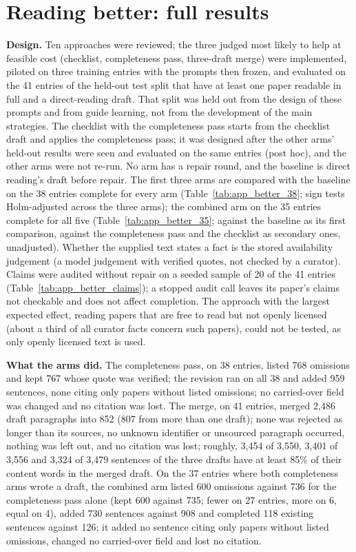 \documentclass{article} %
\begin{document}
\section{Reading better: full results}
\label{app:better}
\textbf{Design.} Ten approaches were reviewed; the three judged most likely to help at feasible cost (checklist, completeness pass, three-draft merge) were implemented, piloted on three training entries with the prompts then frozen, and evaluated on the 41 entries of the held-out test split that have at least one paper readable in full and a direct-reading draft. That split was held out from the design of these prompts and from guide learning, not from the development of the main strategies. The checklist with the completeness pass starts from the checklist draft and applies the completeness pass; it was designed after the other arms' held-out results were seen and evaluated on the same entries (post hoc), and the other arms were not re-run. No arm has a repair round, and the baseline is direct reading's draft before repair. The first three arms are compared with the baseline on the 38 entries complete for every arm (Table~\ref{tab:app_better_38}; sign tests Holm-adjusted across the three arms); the combined arm on the 35 entries complete for all five (Table~\ref{tab:app_better_35}; against the baseline as its first comparison, against the completeness pass and the checklist as secondary ones, unadjusted). Whether the supplied text states a fact is the stored availability judgement (a model judgement with verified quotes, not checked by a curator). Claims were audited without repair on a seeded sample of 20 of the 41 entries (Table~\ref{tab:app_better_claims}); a stopped audit call leaves its paper's claims not checkable and does not affect completion. The approach with the largest expected effect, reading papers that are free to read but not openly licensed (about a third of all curator facts concern such papers), could not be tested, as only openly licensed text is used.

\textbf{What the arms did.} The completeness pass, on 38 entries, listed 768 omissions and kept 767 whose quote was verified; the revision ran on all 38 and added 959 sentences, none citing only papers without listed omissions; no carried-over field was changed and no citation was lost. The merge, on 41 entries, merged 2,486 draft paragraphs into 852 (807 from more than one draft); none was rejected as longer than its sources, no unknown identifier or unsourced paragraph occurred, nothing was left out, and no citation was lost; roughly, 3,454 of 3,550, 3,401 of 3,556 and 3,324 of 3,479 sentences of the three drafts have at least 85\% of their content words in the merged draft. On the 37 entries where both completeness arms wrote a draft, the combined arm listed 600 omissions against 736 for the completeness pass alone (kept 600 against 735; fewer on 27 entries, more on 6, equal on 4), added 730 sentences against 908 and completed 118 existing sentences against 126; it added no sentence citing only papers without listed omissions, changed no carried-over field and lost no citation.
\end{document}
